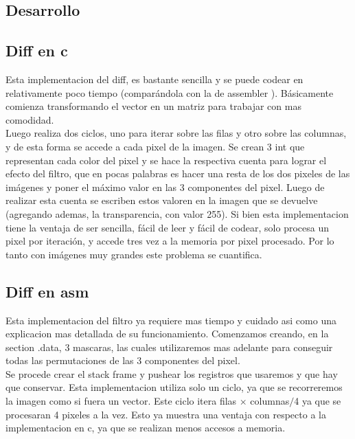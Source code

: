 \subsection{Desarrollo}

\subsection{Diff en c}

Esta implementacion del diff, es bastante sencilla y se puede codear en relativamente poco tiempo (comparándola con la de assembler ). Básicamente comienza transformando el vector en un matriz para trabajar con mas comodidad. \\
Luego realiza dos ciclos, uno para iterar sobre las filas y otro sobre las columnas, y de esta forma se accede a cada pixel de la imagen. Se crean 3 int que representan cada color del pixel y se hace la respectiva cuenta para lograr el efecto del filtro, que en pocas palabras es hacer una resta de los dos pixeles de las imágenes y poner el máximo valor en las 3 componentes del pixel. Luego de realizar esta cuenta se escriben estos valoren en la imagen que se devuelve (agregando ademas, la transparencia, con valor 255). Si bien esta implementacion tiene la ventaja de ser sencilla, fácil de leer y fácil de codear, solo procesa un pixel por iteración, y accede tres vez a la memoria por pixel procesado. Por lo tanto con imágenes muy grandes este problema se cuantifica.
 
\subsection{Diff en asm}

Esta implementacion del filtro ya requiere mas tiempo y cuidado asi como una explicacion mas detallada de su funcionamiento. Comenzamos creando, en la section .data, 3 mascaras, las cuales utilizaremos mas adelante para conseguir todas las permutaciones de las 3 componentes del pixel. \\
Se procede crear el stack frame y pushear los registros que usaremos y que hay que conservar. Esta implementacion utiliza solo un ciclo, ya que se recorreremos la imagen como si fuera un vector. Este ciclo itera filas $\times$ columnas$/$4  ya que se procesaran 4 pixeles a la vez. Esto ya muestra una ventaja con respecto a la implementacion en c, ya que se realizan menos accesos a memoria. \\

